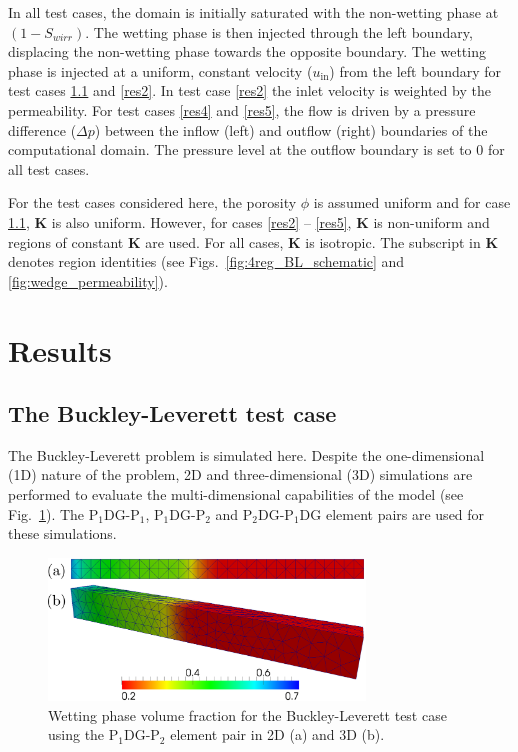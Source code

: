 \documentclass[times]{fldauth}
\newcommand{\PN}[2][error]{P$_{#1}$DG-P$_{#2}$}
\begin{document}
In all test cases, the domain is initially saturated with the
non-wetting phase at $(1- S_{wirr}).$ The wetting phase is then
injected through the left boundary, displacing the non-wetting phase
towards the opposite boundary. The wetting phase is injected at a
uniform, constant velocity ($u_{\mathrm{in}}$) from the left boundary
for test cases  \ref{classical_BL} and  \ref{res2}. In test case \ref{res2} the
inlet velocity is weighted by the permeability. For test cases  \ref{res4} and  \ref{res5},
the flow is driven by a pressure difference ($\Delta p$)
between the inflow (left) and outflow (right) boundaries of the
computational domain. The pressure level at the outflow boundary is
set to 0 for all test cases.

For the test cases considered here, the porosity $\phi$ is assumed
uniform and for case \ref{classical_BL}, $\mathbf{K}$ is also
uniform. However, for cases \ref{res2} -- \ref{res5}, $\mathbf{K}$ is
non-uniform and regions of constant $\mathbf{K}$ are used. For all
cases, $\mathbf{K}$ is isotropic. The subscript in $\mathbf{K}$
denotes region identities (see Figs.~\ref{fig:4reg_BL_schematic} and
\ref{fig:wedge_permeability}).




\section{Results}\label{res}



\subsection{The Buckley-Leverett test case}\label{classical_BL}

The Buckley-Leverett problem \cite[non-wetting phase displaced by a
  wetting phase]{buckley1942} is simulated here.  Despite the
one-dimensional (1D) nature of the problem, 2D and three-dimensional
(3D) simulations are performed to evaluate the multi-dimensional
capabilities of the model (see Fig.~\ref{fig:maps2d_3d}). The
\PN[1]{1}, \PN[1]{2} and \PN[2]{1}DG element pairs are used for these
simulations.

\begin{figure}[h!]
  \begin{center}
    \includegraphics[width=0.75\textwidth]{BL_3D_merged}
    \caption{Wetting phase volume fraction for the Buckley-Leverett
      test case using the \PN[1]{2} element pair in 2D (a) and 3D
      (b). \label{fig:maps2d_3d}}
  \end{center}
\end{figure}
\end{document}
